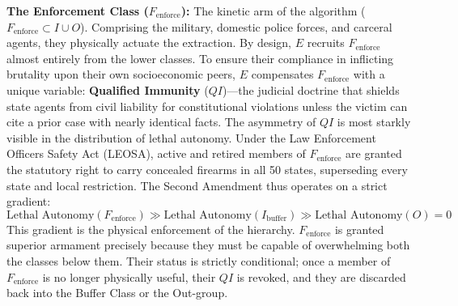 \begin{definition}
\textbf{The Enforcement Class ($F_{\text{enforce}}$):} The kinetic arm of the algorithm ($F_{\text{enforce}} \subset I \cup O$). Comprising the military, domestic police forces, and carceral agents, they physically actuate the extraction. By design, $E$ recruits $F_{\text{enforce}}$ almost entirely from the lower classes. To ensure their compliance in inflicting brutality upon their own socioeconomic peers, $E$ compensates $F_{\text{enforce}}$ with a unique variable: \textbf{Qualified Immunity} ($QI$)---the judicial doctrine that shields state agents from civil liability for constitutional violations unless the victim can cite a prior case with nearly identical facts. The asymmetry of $QI$ is most starkly visible in the distribution of lethal autonomy. Under the Law Enforcement Officers Safety Act (LEOSA), active and retired members of $F_{\text{enforce}}$ are granted the statutory right to carry concealed firearms in all 50 states, superseding every state and local restriction. The Second Amendment thus operates on a strict gradient:
    \begin{equation}\label{eq:6.1-lethal-autonomy-gradient}
\text{Lethal Autonomy}(F_{\text{enforce}}) \gg \text{Lethal Autonomy}(I_{\text{buffer}}) \gg \text{Lethal Autonomy}(O) = 0
\end{equation}
    This gradient is the physical enforcement of the hierarchy. $F_{\text{enforce}}$ is granted superior armament precisely because they must be capable of overwhelming both the classes below them. Their status is strictly conditional; once a member of $F_{\text{enforce}}$ is no longer physically useful, their $QI$ is revoked, and they are discarded back into the Buffer Class or the Out-group.
\end{definition}

